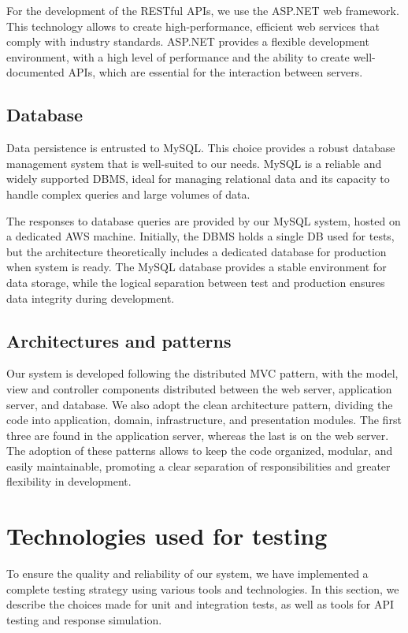 For the development of the RESTful APIs, we use the ASP.NET web framework.
This technology allows to create high-performance, efficient web services that comply with industry standards.
ASP.NET provides a flexible development environment, with a high level of performance and the ability to create well-documented APIs, which are essential for the interaction between servers.

\subsection{Database}

Data persistence is entrusted to MySQL.
This choice provides a robust database management system that is well-suited to our needs.
MySQL is a reliable and widely supported DBMS, ideal for managing relational data and its capacity to handle complex queries and large volumes of data.

The responses to database queries are provided by our MySQL system, hosted on a dedicated AWS machine.
Initially, the DBMS holds a single DB used for tests, but the architecture theoretically includes a dedicated database for production when system is ready.
The MySQL database provides a stable environment for data storage, while the logical separation between test and production ensures data integrity during development.

\subsection{Architectures and patterns}

Our system is developed following the distributed MVC pattern, with the model, view and controller components distributed between the web server, application server, and database.
We also adopt the clean architecture pattern, dividing the code into application, domain, infrastructure, and presentation modules.
The first three are found in the application server, whereas the last is on the web server.
The adoption of these patterns allows to keep the code organized, modular, and easily maintainable, promoting a clear separation of responsibilities and greater flexibility in development.

\section{Technologies used for testing}

To ensure the quality and reliability of our system, we have implemented a complete testing strategy using various tools and technologies.
In this section, we describe the choices made for unit and integration tests, as well as tools for API testing and response simulation.

